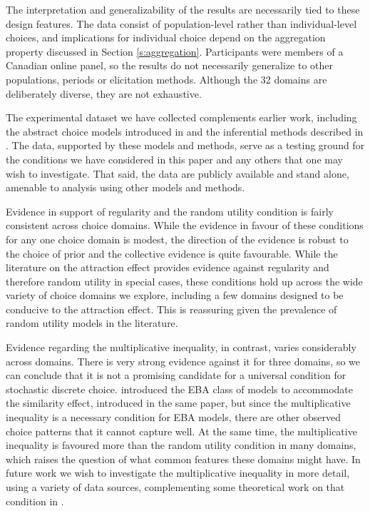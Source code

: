 \documentclass[11pt,letter]{article}
\begin{document}
The interpretation and generalizability of the results are necessarily tied to these design features.
The data consist of population-level rather than individual-level choices, and implications for individual choice depend on the aggregation property discussed in Section \ref{s:aggregation}.
Participants were members of a Canadian online panel, so the results do not necessarily generalize to other populations, periods or elicitation methods.
Although the 32 domains are deliberately diverse, they are not exhaustive.

The experimental dataset we have collected complements earlier work, including the abstract choice models introduced in \citet{McCaMarl13} and the inferential methods described in \citet{McCaMarl14}.
The data, supported by these models and methods, serve as a testing ground for the conditions we have considered in this paper and any others that one may wish to investigate.
That said, the data are publicly available and stand alone, amenable to analysis using other models and methods.

Evidence in support of regularity and the random utility condition is fairly consistent across choice domains.
While the evidence in favour of these conditions for any one choice domain is modest, the direction of the evidence is robust to the choice of prior and the collective evidence is quite favourable.
While the literature on the attraction effect provides evidence against regularity and therefore random utility in special cases, these conditions hold up across the wide variety of choice domains we explore, including a few domains designed to be conducive to the attraction effect.
This is reassuring given the prevalence of random utility models in the literature.

Evidence regarding the multiplicative inequality, in contrast, varies considerably across domains.
There is very strong evidence against it for three domains, so we can conclude that it is not a promising candidate for a universal condition for stochastic discrete choice.
\citet{Tver72a} introduced the EBA class of models to accommodate the similarity effect, introduced in the same paper, but since the multiplicative inequality is a necessary condition for EBA models, there are other observed choice patterns that it cannot capture well.
At the same time, the multiplicative inequality is favoured more than the random utility condition in many domains, which raises the question of what common features these domains might have.
In future work we wish to investigate the multiplicative inequality in more detail, using a variety of data sources, complementing some theoretical work on that condition in \citet{McCaMarl24}.
\end{document}
